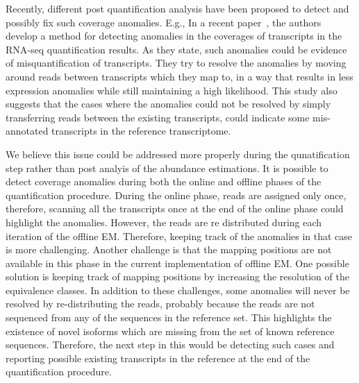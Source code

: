 Recently, different post quantification analysis have been proposed to detect and possibly fix such
coverage anomalies. E.g., In a recent paper~\cite{ma2019detecting}, the authors develop a method for 
detecting anomalies in the coverages of transcripts in the RNA-seq quantification results. As they state, 
such anomalies could be evidence of misquantification of transcripts. They try to resolve the anomalies by 
moving around reads between transcripts which they map to, in a way that results in less expression anomalies 
while still maintaining a high likelihood. This study also suggests that the cases where the anomalies could 
not be resolved by simply transferring reads between the existing transcripts, could indicate some mis-annotated 
transcripts in the reference transcriptome.


We believe this issue could be addressed more properly during the qunatification step rather than post 
analyis of the abundance estimations.
It is possible to detect coverage anomalies during both the online 
and offline phases of the quantification procedure. During the online phase, reads are assigned only once, 
therefore, scanning all the transcripts once at the end of the online phase could highlight the anomalies. However, 
the reads are re distributed during each iteration of the offline EM. Therefore, keeping track of the anomalies 
in that case is more challenging. Another challenge is that the mapping positions are not available in this phase 
in the current implementation of offline EM. One possible solution is keeping track of mapping positions by 
increasing the resolution of the equivalence classes. In addition to these challenges, some anomalies will 
never be resolved by re-distributing the reads, probably because the reads are not sequenced from any of 
the sequences in the reference set. This highlights the existence of novel isoforms which are missing from 
the set of known reference sequences. Therefore, the next step in this would be detecting such cases and 
reporting possible existing transcripts in the reference at the end of the quantification procedure.
